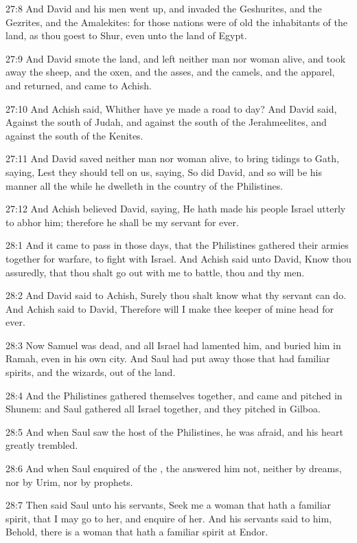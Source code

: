 27:8 And David and his men went up, and invaded the Geshurites, and
the Gezrites, and the Amalekites: for those nations were of old the
inhabitants of the land, as thou goest to Shur, even unto the land of
Egypt.

27:9 And David smote the land, and left neither man nor woman alive,
and took away the sheep, and the oxen, and the asses, and the camels,
and the apparel, and returned, and came to Achish.

27:10 And Achish said, Whither have ye made a road to day? And David
said, Against the south of Judah, and against the south of the
Jerahmeelites, and against the south of the Kenites.

27:11 And David saved neither man nor woman alive, to bring tidings to
Gath, saying, Lest they should tell on us, saying, So did David, and
so will be his manner all the while he dwelleth in the country of the
Philistines.

27:12 And Achish believed David, saying, He hath made his people
Israel utterly to abhor him; therefore he shall be my servant for
ever.

28:1 And it came to pass in those days, that the Philistines gathered
their armies together for warfare, to fight with Israel. And Achish
said unto David, Know thou assuredly, that thou shalt go out with me
to battle, thou and thy men.

28:2 And David said to Achish, Surely thou shalt know what thy servant
can do. And Achish said to David, Therefore will I make thee keeper of
mine head for ever.

28:3 Now Samuel was dead, and all Israel had lamented him, and buried
him in Ramah, even in his own city. And Saul had put away those that
had familiar spirits, and the wizards, out of the land.

28:4 And the Philistines gathered themselves together, and came and
pitched in Shunem: and Saul gathered all Israel together, and they
pitched in Gilboa.

28:5 And when Saul saw the host of the Philistines, he was afraid, and
his heart greatly trembled.

28:6 And when Saul enquired of the \LORD, the \LORD answered him not,
neither by dreams, nor by Urim, nor by prophets.

28:7 Then said Saul unto his servants, Seek me a woman that hath a
familiar spirit, that I may go to her, and enquire of her. And his
servants said to him, Behold, there is a woman that hath a familiar
spirit at Endor.


